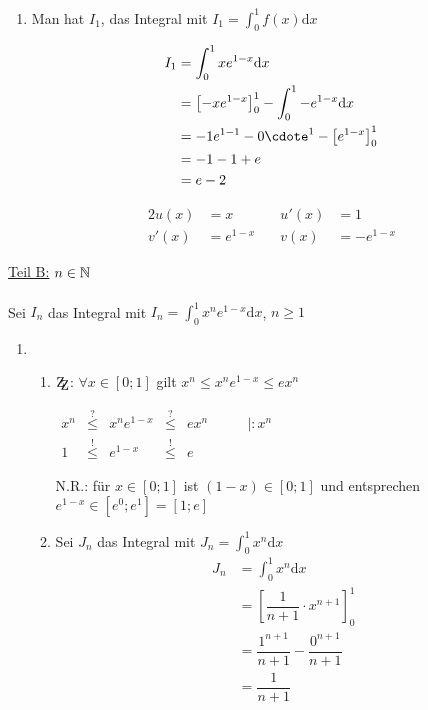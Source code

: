 \begin{Beweis}
\begin{enumerate}
\item Man hat $I_1$,  das Integral mit $I_1=\int_0^1f(x)\mbox{d}x$\\
\begin{minipage}{0.5\textwidth}
\begin{align*}
I_1&=\int_0^1xe^{1-x}\mbox{d}x\\
&=\left[-xe^{1-x}\right]_0^1-\int_0^1-e^{1-x}\mbox{d}x\\
&=-1e^{1-1}-0\cdote^1-\left[e^{1-x}\right]_0^1\\
&=-1-1+e\\
&=e-2
\end{align*}
\end{minipage}
\begin{minipage}{0.5\textwidth}
\begin{alignat*}{2}
u(x)&=x \quad& u\prime(x)&=1\\
v'(x)&=e^{1-x}\quad & v(x)&=-e^{1-x}
\end{alignat*}
\end{minipage}
\end{enumerate}
\underline{Teil B:} $n\in\mathbb{N}$\\\\
Sei $I_n$ das Integral mit $I_n=\int_0^1x^ne^{1-x}\mbox{d}x$, $n\geq 1$\\
\begin{enumerate}
\item %
\begin{enumerate}
\item $\zz$: $\forall x\in[0;1]$ gilt $x^n\leq x^ne^{1-x} \leq ex^n$\\
\begin{center}
$\begin{array}{cccccc}
x^n &\stackrel{?}{\leq}& x^ne^{1-x} &\stackrel{?}{\leq}& ex^n&\qquad|:x^n\\
1        &\stackrel{!}{\leq}&e^{1-x}         &\stackrel{!}{\leq}&e        &
\end{array}$
\end{center}
N.R.: für $x\in[0;1]$ ist $(1-x)\in[0;1]$ und entsprechen $e^{1-x}\in[e^{0};e^{1}]=[1;e]$
\item Sei $J_n$ das Integral mit $J_n=\int_0^1x^n\mbox{d}x$
\begin{align*}
J_n&=\int_0^1x^n\mbox{d}x\\
&=\left[\dfrac{1}{n+1}\cdot x^{n+1}\right]_0^1\\
&=\dfrac{1^{n+1}}{n+1}-\dfrac{0^{n+1}}{n+1}\\
&=\dfrac{1}{n+1}
\end{align*}

\end{enumerate}
\end{enumerate}
\end{Beweis}
